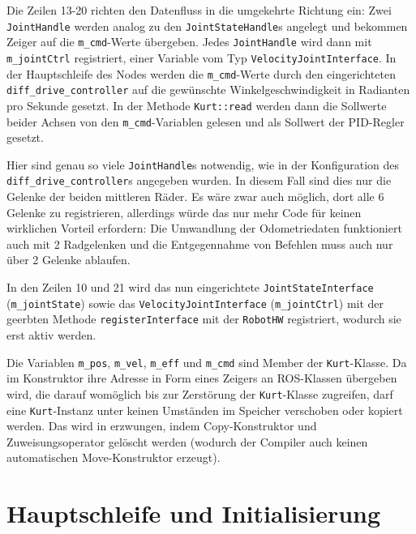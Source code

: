 \documentclass[german]{thesis_KBS}
\newcommand{\code}[1]{\texttt{#1}}  %
\begin{document}
Die Zeilen 13-20 richten den Datenfluss in die umgekehrte Richtung ein: Zwei
\code{JointHandle} werden analog zu den \code{JointStateHandle}s angelegt und
bekommen Zeiger auf die \code{m\_cmd}-Werte übergeben. Jedes \code{JointHandle}
wird dann mit \code{m\_jointCtrl} registriert, einer Variable vom Typ
\code{VelocityJointInterface}. In der Hauptschleife des Nodes werden die
\code{m\_cmd}-Werte durch den eingerichteten \code{diff\_drive\_controller} auf
die gewünschte Winkelgeschwindigkeit in Radianten pro Sekunde gesetzt. In der
Methode \code{Kurt::read} werden dann die Sollwerte beider Achsen von den
\code{m\_cmd}-Variablen gelesen und als Sollwert der PID-Regler gesetzt.

Hier sind genau so viele \code{JointHandle}s notwendig, wie in der Konfiguration
des \code{diff\_drive\_controller}s angegeben wurden. In diesem Fall sind dies
nur die Gelenke der beiden mittleren Räder. Es wäre zwar auch möglich, dort alle
6 Gelenke zu registrieren, allerdings würde das nur mehr Code für keinen
wirklichen Vorteil erfordern: Die Umwandlung der Odometriedaten funktioniert
auch mit 2 Radgelenken und die Entgegennahme von Befehlen muss auch nur über 2
Gelenke ablaufen.

In den Zeilen 10 und 21 wird das nun eingerichtete \code{JointStateInterface}
(\code{m\_jointState}) sowie das \code{VelocityJointInterface}
(\code{m\_jointCtrl}) mit der geerbten Methode \code{registerInterface} mit der
\code{RobotHW} registriert, wodurch sie erst aktiv werden.

Die Variablen \code{m\_pos}, \code{m\_vel}, \code{m\_eff} und \code{m\_cmd} sind
Member der \code{Kurt}-Klasse. Da im Konstruktor ihre Adresse in Form eines
Zeigers an ROS-Klassen übergeben wird, die darauf womöglich bis zur Zerstörung
der \code{Kurt}-Klasse zugreifen, darf eine \code{Kurt}-Instanz unter keinen
Umständen im Speicher verschoben oder kopiert werden. Das wird in
 erzwungen, indem Copy-Konstruktor und Zuweisungsoperator
gelöscht werden (wodurch der Compiler auch keinen automatischen Move-Konstruktor
erzeugt).



\section{Hauptschleife und Initialisierung}
\end{document}
